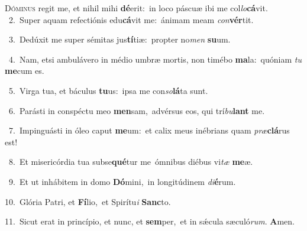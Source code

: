 \lettrine{\initial\textcolor{\initialcolor}{D}}{óminus} regit me, et nihil mihi \textbf{dé}\-erit:~\star in loco páscuæ ibi me col\-\textit{lo}\-\textbf{cá}vit.\\
{\numbfont\textcolor{\numbcolor}{~2.}}~Super aquam refectiónis edu\-\textbf{cá}\-vit me:~\star ánimam meam \textit{con}\-\textbf{vér}tit.\par
{\numbfont\textcolor{\numbcolor}{~3.}}~Dedúxit me super sémitas jus\-\textbf{tí}\-tiæ:~\star propter no\textit{men} \textbf{su}\-um.\par
{\numbfont\textcolor{\numbcolor}{~4.}}~Nam, etsi ambulávero in médio umbræ mortis, non timébo \textbf{ma}\-la:~\star quóniam \textit{tu} \textbf{me}\-cum es.\par
{\numbfont\textcolor{\numbcolor}{~5.}}~Virga tua, et báculus \textbf{tu}\-us:~\star ipsa me con\-\textit{so}\-\textbf{lá}ta sunt.\par
{\numbfont\textcolor{\numbcolor}{~6.}}~Parásti in conspéctu meo \textbf{men}\-sam,~\star advérsus eos, qui trí\-\textit{bu}\-\textbf{lant} me.\par
{\numbfont\textcolor{\numbcolor}{~7.}}~Impinguásti in óleo caput \textbf{me}\-um:~\star et calix meus inébrians quam \textit{præ}\-\textbf{clá}rus est!\par
{\numbfont\textcolor{\numbcolor}{~8.}}~Et misericórdia tua subse\-\textbf{qué}\-tur me~\star ómnibus diébus vi\textit{tæ} \textbf{me}\-æ.\par
{\numbfont\textcolor{\numbcolor}{~9.}}~Et ut inhábitem in domo \textbf{Dó}\-mini,~\star in longitúdinem \textit{di}\-\textbf{é}rum.\par
{\numbfont\textcolor{\numbcolor}{10.}}~Glória Patri, et \textbf{Fí}\-lio,~\star et Spirítu\textit{i} \textbf{Sanc}\-to.\par
{\numbfont\textcolor{\numbcolor}{11.}}~Sicut erat in princípio, et nunc, et \textbf{sem}\-per,~\star et in sǽcula sæculó\-\textit{rum}\-. \textbf{A}\-men.\par
